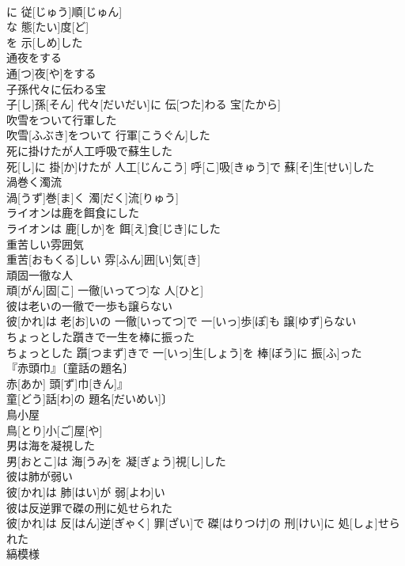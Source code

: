 \documentclass[8pt]{extreport}
\begin{document}
\begin{CJK}{UTF8}{min}
\\	に 従[じゅう]順[じゅん]
\\	な 態[たい]度[ど]
\\	を 示[しめ]した 
\\	通夜をする	
\\	通[つ]夜[や]をする
\\	子孫代々に伝わる宝	
\\	子[し]孫[そん] 代々[だいだい]に 伝[つた]わる 宝[たから]
\\	吹雪をついて行軍した	
\\	吹雪[ふぶき]をついて 行軍[こうぐん]した
\\	死に掛けたが人工呼吸で蘇生した	
\\	死[し]に 掛[か]けたが 人工[じんこう] 呼[こ]吸[きゅう]で 蘇[そ]生[せい]した
\\	渦巻く濁流	
\\	渦[うず]巻[ま]く 濁[だく]流[りゅう]
\\	ライオンは鹿を餌食にした	
\\	ライオンは 鹿[しか]を 餌[え]食[じき]にした
\\	重苦しい雰囲気	
\\	重苦[おもくる]しい 雰[ふん]囲[い]気[き]
\\	頑固一徹な人	
\\	頑[がん]固[こ] 一徹[いってつ]な 人[ひと]
\\	彼は老いの一徹で一歩も譲らない	
\\	彼[かれ]は 老[お]いの 一徹[いってつ]で 一[いっ]歩[ぽ]も 譲[ゆず]らない
\\	ちょっとした躓きで一生を棒に振った	
\\	ちょっとした 躓[つまず]きで 一[いっ]生[しょう]を 棒[ぼう]に 振[ふ]った
\\	『赤頭巾』〔童話の題名〕	
\\	赤[あか] 頭[ず]巾[きん]』
\\	童[どう]話[わ]の 題名[だいめい]〕
\\	鳥小屋	
\\	鳥[とり]小[ご]屋[や]
\\	男は海を凝視した	
\\	男[おとこ]は 海[うみ]を 凝[ぎょう]視[し]した
\\	彼は肺が弱い	
\\	彼[かれ]は 肺[はい]が 弱[よわ]い
\\	彼は反逆罪で磔の刑に処せられた	
\\	彼[かれ]は 反[はん]逆[ぎゃく] 罪[ざい]で 磔[はりつけ]の 刑[けい]に 処[しょ]せられた
\\	縞模様	

\end{CJK}
\end{document}
